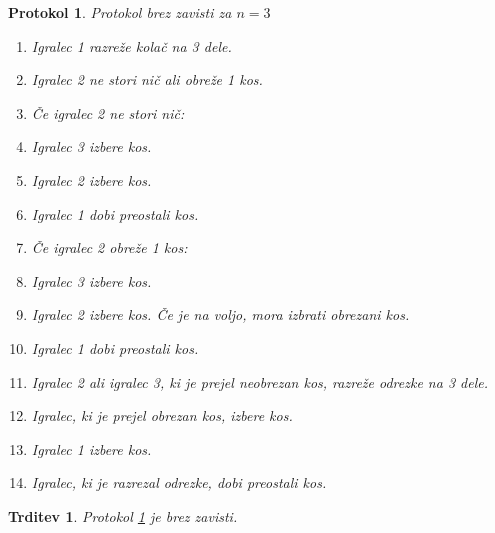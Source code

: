 \documentclass[a4paper, 12pt]{article}
\newtheorem{trditev}{Trditev}
\newtheorem{protokol}{Protokol}
\begin{document}
	\begin{protokol}
		\label{brez_zavisti}
		Protokol brez zavisti za $n = 3$
		\begin{enumerate}
			
			\item Igralec 1 razreže kolač na 3 dele.
			
			\item Igralec 2 ne stori nič ali obreže 1 kos.
			
			\item[] Če igralec 2 ne stori nič:
			
			\item \qquad Igralec 3 izbere kos.
			
			\item \qquad Igralec 2 izbere kos.
			
			\item \qquad Igralec 1 dobi preostali kos.
			
			\item[] Če igralec 2 obreže 1 kos:
			
			\setcounter{enumi}{2}
			
			\item \qquad Igralec 3 izbere kos.
			
			\item \qquad Igralec 2 izbere kos. Če je na voljo, mora izbrati obrezani kos.
			
			\item \qquad Igralec 1 dobi preostali kos.
			
			\item \qquad Igralec 2 ali igralec 3, ki je prejel neobrezan kos, razreže odrezke na 3 dele.
			
			\item \qquad Igralec, ki je prejel obrezan kos, izbere kos.
			
			\item \qquad Igralec 1 izbere kos.
			
			\item \qquad Igralec, ki je razrezal odrezke, dobi preostali kos.
			
		\end{enumerate}
	\end{protokol}
	
	\begin{trditev}
		Protokol \ref{brez_zavisti} je brez zavisti.
	\end{trditev}
\end{document}
